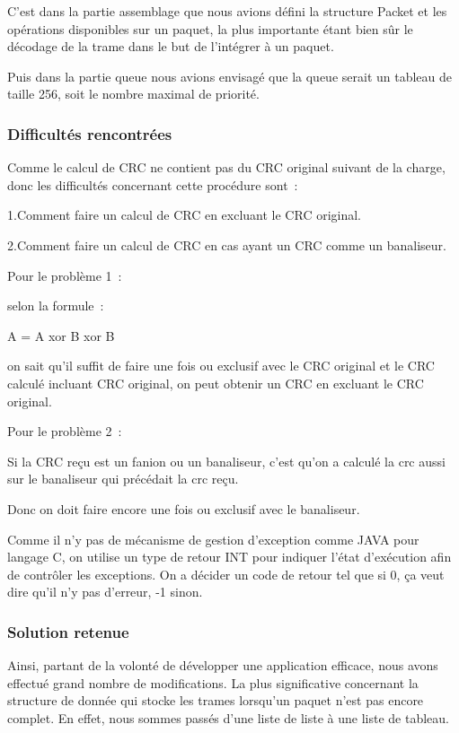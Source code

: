 \documentclass[a4paper,11pt]{article}
\begin{document}
C'est dans la partie assemblage que nous avions défini la structure Packet et les opérations disponibles sur un paquet, la plus importante étant bien sûr le décodage de la trame dans le but de l'intégrer à un paquet.

Puis dans la partie queue nous avions envisagé que la queue serait un tableau de taille 256, soit le nombre maximal de priorité. 


\subsubsection{Difficultés rencontrées}

Comme le calcul de CRC ne contient pas du CRC original suivant de la charge, donc les difficultés concernant cette procédure sont :

1.Comment faire un calcul de CRC en excluant le CRC original.

2.Comment faire un calcul de CRC en cas ayant un CRC comme un banaliseur.

\vspace{0.5cm}

Pour le problème 1 :

selon la formule :

A = A xor B xor B

on sait qu'il suffit de faire une fois ou exclusif avec le CRC original et le CRC calculé incluant CRC original, on peut obtenir un CRC  en excluant le CRC original.

Pour le problème 2 :

Si la CRC reçu est un fanion ou un banaliseur, c'est qu'on a
 calculé la crc aussi sur le banaliseur qui précédait la crc reçu.

Donc on doit faire encore une fois ou exclusif avec le banaliseur.


Comme il n'y pas de mécanisme de gestion d'exception comme JAVA pour langage C, on utilise un type de retour INT pour indiquer l'état d'exécution afin de contrôler les exceptions.
On a décider un code de retour tel que si 0, ça veut dire qu'il n'y pas d'erreur, -1 sinon.

\subsubsection{Solution retenue}

Ainsi, partant de la volonté de développer une application efficace, nous avons effectué grand nombre de modifications. La plus significative concernant la structure de donnée qui stocke les trames lorsqu'un paquet n'est pas encore complet. En effet, nous sommes passés d'une liste de liste à une liste de tableau.
\end{document}
